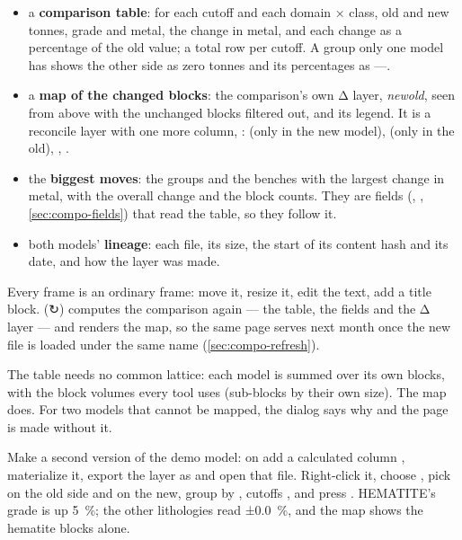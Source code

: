 \begin{itemize}
\item a \textbf{comparison table}: for each cutoff and each domain × class, old and new tonnes, grade and metal, the change in metal, and each change as a percentage of the old value; a total row per cutoff. A group only one model has shows the other side as zero tonnes and its percentages as —.
\item a \textbf{map of the changed blocks}: the comparison's own Δ layer, \emph{new}\emph{old}, seen from above with the unchanged blocks filtered out, and its legend. It is a reconcile layer with one more column, :  (only in the new model),  (only in the old), , .
\item the \textbf{biggest moves}: the groups and the benches with the largest change in metal, with the overall change and the block counts. They are fields (, , \cref{sec:compo-fields}) that read the table, so they follow it.
\item both models' \textbf{lineage}: each file, its size, the start of its content hash and its date, and how the layer was made.
\end{itemize}

Every frame is an ordinary frame: move it, resize it, edit the text, add a title block.  (↻) computes the comparison again — the table, the fields and the Δ layer — and renders the map, so the same page serves next month once the new file is loaded under the same name (\cref{sec:compo-refresh}).

The table needs no common lattice: each model is summed over its own blocks, with the block volumes every tool uses (sub-blocks by their own size). The map does. For two models that cannot be mapped, the dialog says why and the page is made without it.

\begin{tryit}
Make a second version of the demo model: on  add a calculated column , materialize it, export the layer as  and open that file. Right-click it, choose , pick  on the old side and  on the new, group by , cutoffs , and press . HEMATITE's grade is up 5~\%; the other lithologies read ±0.0~\%, and the map shows the hematite blocks alone.
\end{tryit}

